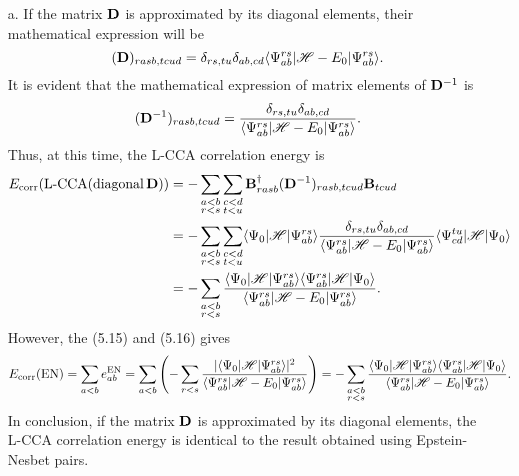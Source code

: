 \documentclass[a4paper]{book}
\newcounter{solution}[chapter]
\newcommand{\corr}{{\rm corr}}
\newcommand{\B}{{\bf B}}
\newcommand{\D}{{\bf D}}
\begin{document}
	\begin{solution}
	
	\begin{itemize}
	
	\item[a.] If the matrix $\D$ is approximated by its diagonal elements, their mathematical expression will be
	\[
		(\D)_{rasb,tcud} = \delta_{rs,tu} \delta_{ab,cd} \langle \Psi^{rs}_{ab} | \mathscr{H} - E_0 | \Psi^{rs}_{ab} \rangle .
	\]	
	It is evident that the mathematical expression of matrix elements of $\D^{-1}$ is
	\[
		(\D^{-1})_{rasb,tcud} = \frac{ \delta_{rs,tu} \delta_{ab,cd} }{ \langle \Psi^{rs}_{ab} | \mathscr{H} - E_0 | \Psi^{rs}_{ab} \rangle } .
	\]
	Thus, at this time, the L-CCA correlation energy is
	\begin{align*}
		E_\corr(\text{L-CCA(diagonal\,\D}) ) &= - \sum_{ \substack{ a<b \\ r<s } } \sum_{ \substack{ c<d \\ t<u } } \B^\dagger_{rasb} (\D^{-1})_{rasb,tcud} \B_{tcud} \\
		&= - \sum_{ \substack{ a<b \\ r<s } } \sum_{ \substack{ c<d \\ t<u } } \langle \Psi_0 | \mathscr{H} | \Psi^{rs}_{ab} \rangle \frac{ \delta_{rs,tu} \delta_{ab,cd} }{ \langle \Psi^{rs}_{ab} | \mathscr{H} - E_0 | \Psi^{rs}_{ab} \rangle } \langle \Psi^{tu}_{cd} | \mathscr{H} | \Psi_0 \rangle \\
		&= - \sum_{ \substack{ a<b \\ r<s } } \frac{ \langle \Psi_0 | \mathscr{H} | \Psi^{rs}_{ab} \rangle \langle \Psi^{rs}_{ab} | \mathscr{H} | \Psi_0 \rangle }{ \langle \Psi^{rs}_{ab} | \mathscr{H} - E_0 | \Psi^{rs}_{ab} \rangle } .
	\end{align*}
	However, the (5.15) and (5.16) gives
	\[
		E_\corr({\rm EN}) = \sum_{a<b} e^{\rm EN}_{ab} = \sum_{ a<b } \left( - \sum_{ r<s } \frac{ | \langle \Psi_0 | \mathscr{H} | \Psi^{rs}_{ab} \rangle |^2 }{ \langle \Psi^{rs}_{ab} | \mathscr{H} - E_0 | \Psi^{rs}_{ab} \rangle } \right) = - \sum_{ \substack{ a<b \\ r<s } } \frac{ \langle \Psi_0 | \mathscr{H} | \Psi^{rs}_{ab} \rangle \langle \Psi^{rs}_{ab} | \mathscr{H} | \Psi_0 \rangle }{ \langle \Psi^{rs}_{ab} | \mathscr{H} - E_0 | \Psi^{rs}_{ab} \rangle }.
	\]
	In conclusion, if the matrix $\D$ is approximated by its diagonal elements, the L-CCA correlation energy is identical to the result obtained using Epstein-Nesbet pairs.
	

\end{itemize}
\end{solution}
\end{document}
